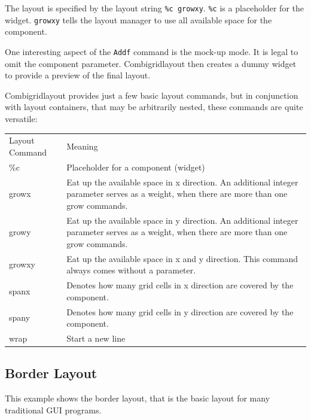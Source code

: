 The layout is specified by the layout string \texttt{\%c growxy}.
\texttt{\%c} is a placeholder for the widget. \texttt{growxy} tells the
layout manager to use all available space for the component.

One interesting aspect of the \texttt{Addf} command is the mock-up mode.
It is legal to omit the component parameter. Combigridlayout then
creates a dummy widget to provide a preview of the final layout.

Combigridlayout provides just a few basic layout commands, but in
conjunction with layout containers, that may be arbitrarily nested,
these commands are quite versatile:

\vspace{1em}
\begin{tabular}{lp{9cm}}
Layout Command & Meaning\\[0.5ex]
\%c & Placeholder for a component (widget)\\[0.5ex]
growx & Eat up the available space in x direction. An additional integer
parameter serves as a weight, when there are more than one grow
commands.\\[0.5ex]
growy & Eat up the available space in y direction. An additional integer
parameter serves as a weight, when there are more than one grow
commands.\\[0.5ex]
growxy & Eat up the available space in x and y direction. This command
always comes without a parameter.\\[0.5ex]
spanx & Denotes how many grid cells in x direction are covered by the
component.\\[0.5ex]
spany & Denotes how many grid cells in y direction are covered by the
component.\\[0.5ex]
wrap & Start a new line
\end{tabular}
\vspace{1em}

\pagebreak

\subsection{Border Layout}

This example shows the border layout, that is the basic layout for many
traditional GUI programs.

